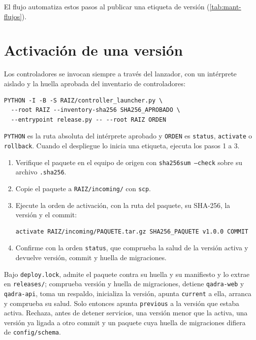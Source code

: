 El flujo  automatiza estos pasos al
publicar una etiqueta de versión (\cref{tab:mant-flujos}).

\section{Activación de una versión}\label{sec:desp-activacion}

Los controladores se invocan siempre a través del lanzador, con un intérprete
aislado y la huella aprobada del inventario de controladores:

\begin{verbatim}
PYTHON -I -B -S RAIZ/controller_launcher.py \
  --root RAIZ --inventory-sha256 SHA256_APROBADO \
  --entrypoint release.py -- --root RAIZ ORDEN
\end{verbatim}

\texttt{PYTHON} es la ruta absoluta del intérprete aprobado y \texttt{ORDEN}
es \texttt{status}, \texttt{activate} o \texttt{rollback}. Cuando el
despliegue lo inicia una etiqueta, \archivo{scripts/deploy-via-ssh.sh}
ejecuta los pasos 1 a 3.

\begin{enumerate}
  \item Verifique el paquete en el equipo de origen con
    \texttt{sha256sum --check} sobre su archivo \texttt{.sha256}.
  \item Copie el paquete a \texttt{RAIZ/incoming/} con \texttt{scp}.
  \item Ejecute la orden de activación, con la ruta del paquete, su
    SHA-256, la versión y el commit:
\begin{verbatim}
activate RAIZ/incoming/PAQUETE.tar.gz SHA256_PAQUETE v1.0.0 COMMIT
\end{verbatim}
  \item Confirme con la orden \texttt{status}, que comprueba la salud de
    la versión activa y devuelve versión, commit y huella de migraciones.
\end{enumerate}

Bajo \texttt{deploy.lock},  admite el
paquete contra su huella y su manifiesto y lo extrae en
\texttt{releases/}; comprueba versión y huella de migraciones, detiene
\texttt{qadra-web} y \texttt{qadra-api}, toma un respaldo, inicializa la
versión, apunta \texttt{current} a ella, arranca y comprueba su salud. Solo entonces apunta \texttt{previous} a la versión
que estaba activa. Rechaza, antes de detener servicios, una versión menor que la
activa, una versión ya ligada a otro commit y un paquete cuya huella de
migraciones difiera de \texttt{config/schema}.

